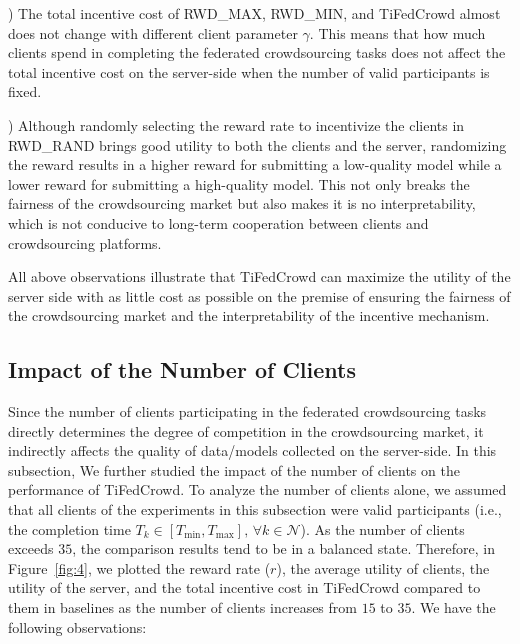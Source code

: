 \documentclass[final,1p,times]{elsarticle}
\begin{document}
\lowercase{}) The total incentive cost of RWD\_MAX, RWD\_MIN, and TiFedCrowd almost does not change with different client parameter $\gamma$. This means that how much clients spend in completing the federated crowdsourcing tasks does not affect the total incentive cost on the server-side when the number of valid participants is fixed.

\lowercase{}) Although randomly selecting the reward rate to incentivize the clients in RWD\_RAND brings good utility to both the clients and the server, randomizing the reward results in a higher reward for submitting a low-quality model while a lower reward for submitting a high-quality model. This not only breaks the fairness of the crowdsourcing market but also makes it is no interpretability, which is not conducive to long-term cooperation between clients and crowdsourcing platforms.

All above observations illustrate that TiFedCrowd can maximize the utility of the server side with as little cost as possible on the premise of ensuring the fairness of the crowdsourcing market and the interpretability of the incentive mechanism.

\subsection{Impact of the Number of Clients}\label{ITNC}
Since the number of clients participating in the federated crowdsourcing tasks directly determines the degree of competition in the crowdsourcing market, it indirectly affects the quality of data/models collected on the server-side. In this subsection, We further studied the impact of the number of clients on the performance of TiFedCrowd. To analyze the number of clients alone, we assumed that all clients of the experiments in this subsection were valid participants (i.e., the completion time $T_k\in[T_{\min},T_{\max}],\,\forall k\in\bm{\mathcal{N}}$). As the number of clients exceeds $35$, the comparison results tend to be in a balanced state. Therefore, in Figure~\ref{fig:4}, we plotted the reward rate ($r$), the average utility of clients, the utility of the server, and the total incentive cost in TiFedCrowd compared to them in baselines as the number of clients increases from $15$ to $35$. We have the following observations:
\end{document}
